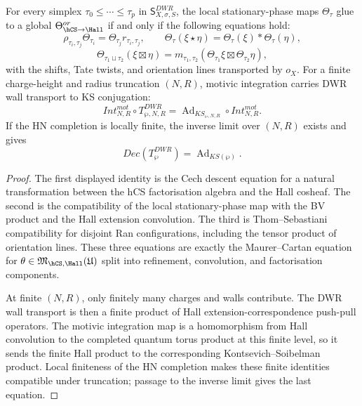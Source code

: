\begin{proposition}
\label{gluing:prop:compact-k3e-full-nerve-equations}
For every simplex
\(\tau_0\leq\cdots\leq\tau_p\) in
\(\mathsf S^{DWR}_{X,\sigma,S}\), the local stationary-phase maps
\(\Theta_\tau\) glue to a global
\(\Theta^{or}_{\hCS\to\Hall}\) if and only if the following equations
hold:
\[
 \rho_{\tau_i,\tau_j}\Theta_{\tau_i}
 =
 \Theta_{\tau_j}r_{\tau_i,\tau_j},
 \qquad
 \Theta_{\tau}(\xi\star\eta)
 =
 \Theta_{\tau}(\xi)*\Theta_{\tau}(\eta),
\]
\[
 \Theta_{\tau_1\sqcup\tau_2}(\xi\boxtimes\eta)
 =
 m_{\tau_1,\tau_2}(\Theta_{\tau_1}\xi\boxtimes\Theta_{\tau_2}\eta),
\]
with the shifts, Tate twists, and orientation lines transported by
\(o_X\). For a finite charge-height and radius truncation
\((N,R)\), motivic integration carries DWR wall transport to KS
conjugation:
\[
 Int^{mot}_{N,R}\circ T^{DWR}_{\wp,N,R}
 =
 \operatorname{Ad}_{KS_{\wp,N,R}}\circ Int^{mot}_{N,R}.
\]
If the HN completion is locally finite, the inverse limit over
\((N,R)\) exists and gives
\[
 Dec(T^{DWR}_{\wp})=\operatorname{Ad}_{KS(\wp)}.
\]
\end{proposition}

\begin{proof}
The first displayed identity is the Cech descent equation for a natural
transformation between the hCS factorisation algebra and the Hall
cosheaf. The second is the compatibility of the local stationary-phase
map with the BV product and the Hall extension convolution. The third
is Thom--Sebastiani compatibility for disjoint Ran configurations,
including the tensor product of orientation lines. These three
equations are exactly the Maurer--Cartan equation for
\(\theta\in\mathfrak M_{\hCS,\Hall}(\mathfrak U)\) split into
refinement, convolution, and factorisation components.

At finite \((N,R)\), only finitely many charges and walls contribute.
The DWR wall transport is then a finite product of Hall
extension-correspondence push-pull operators. The motivic integration
map is a homomorphism from Hall convolution to the completed quantum
torus product at this finite level, so it sends the finite Hall product
to the corresponding Kontsevich--Soibelman product. Local finiteness
of the HN completion makes these finite identities compatible under
truncation; passage to the inverse limit gives the last equation.
\end{proof}

